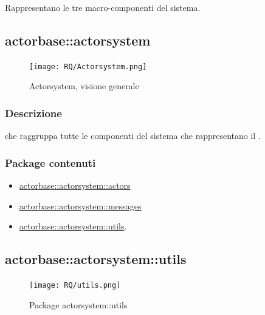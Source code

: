 \documentclass{scalatekids-article}
\begin{document}
Rappresentano le tre macro-componenti del sistema.


\subsection{actorbase::actorsystem}
\label{sec:actorbase::actorsystem}

\begin{figure}[H]
  \begin{center}
    \texttt{[image: RQ/Actorsystem.png]}
    \caption{Actorsystem, visione generale}
  \end{center}
\end{figure}

\subsubsection{Descrizione}

 che raggruppa tutte le componenti del sistema che
rappresentano il .

\subsubsection{Package contenuti}

\begin{itemize}
\item \hyperref[sec:actorbase::actorsystem::actors]{actorbase::actorsystem::actors}
\item \hyperref[sec:actorbase::actorsystem::messages]{actorbase::actorsystem::messages}
\item \hyperref[sec:actorbase::actorsystem::utils]{actorbase::actorsystem::utils}.
\end{itemize}

\subsection{actorbase::actorsystem::utils}
\label{sec:actorbase::actorsystem::utils}

\begin{figure}[H]
  \begin{center}
    \texttt{[image: RQ/utils.png]}
    \caption{Package actorsystem::utils}
  \end{center}
\end{figure}
\end{document}
